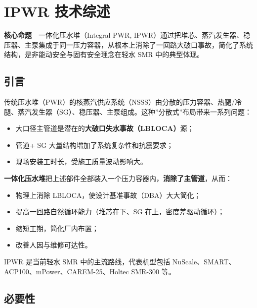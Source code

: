 \documentclass[
  UTF8,
  scheme=plain,
  fontsize=10pt,
  openany
]{ctexbook}
\begin{document}
\cleardoublepage

\chapter{IPWR 技术综述}\label{ipwr-ux6280ux672fux7efcux8ff0}

\begin{epigraph}

\textbf{核心命题}　一体化压水堆（Integral PWR,
IPWR）通过把堆芯、蒸汽发生器、稳压器、主泵集成于同一压力容器，从根本上消除了一回路大破口事故，简化了系统结构，是非能动安全与固有安全理念在轻水
SMR 中的典型体现。

\end{epigraph}

\section{引言}\label{ux5f15ux8a00-2}

传统压水堆（PWR）的核蒸汽供应系统（NSSS）由分散的压力容器、热腿/冷腿、蒸汽发生器（SG）、稳压器、主泵组成。这种''分散式''布局带来一系列问题：

\begin{itemize}
\tightlist
\item
  大口径主管道是潜在的\textbf{大破口失水事故（LBLOCA）}源；
\item
  管道+ SG 大量结构增加了系统复杂性和抗震要求；
\item
  现场安装工时长，受施工质量波动影响大。
\end{itemize}

\textbf{一体化压水堆}把上述部件全部装入一个压力容器内，\textbf{消除了主管道}，从而：

\begin{itemize}
\tightlist
\item
  物理上消除 LBLOCA，使设计基准事故（DBA）大大简化；
\item
  提高一回路自然循环能力（堆芯在下、SG 在上，密度差驱动循环）；
\item
  缩短工期，简化厂内布置；
\item
  改善人因与维修可达性。
\end{itemize}

IPWR 是当前轻水 SMR 中的主流路线，代表机型包括
NuScale、SMART、ACP100、mPower、CAREM-25、Holtec SMR-300 等。

\section{必要性}\label{ux5fc5ux8981ux6027}
\end{document}
